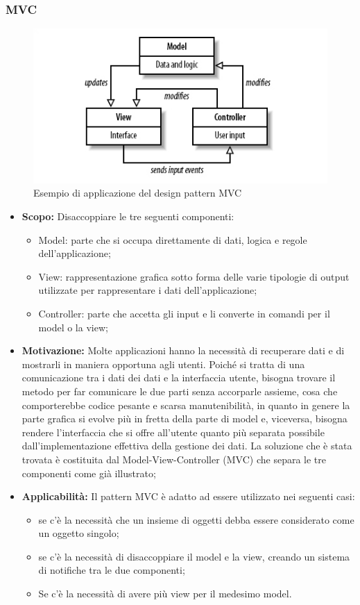 \documentclass{scalatekids-article}
\begin{document}
\subsubsection{MVC}
\begin{figure}[H]
	\begin{center}
		\includegraphics[width=0.9 \textwidth, keepaspectratio]{img/designPattern/mvc.jpg}
		\caption{Esempio di applicazione del design pattern MVC}
	\end{center}
\end{figure}
\begin{itemize}
	\item \textbf{Scopo:} Disaccoppiare le tre seguenti componenti:
	\begin{itemize}
		\item Model: parte che si occupa direttamente di dati, logica e regole dell'applicazione;
		\item View: rappresentazione grafica sotto forma delle varie tipologie di output utilizzate per rappresentare i dati dell'applicazione;
		\item Controller: parte che accetta gli input e li converte in comandi per il model o la view;
	\end{itemize}
	 \item \textbf{Motivazione:} Molte applicazioni hanno la necessità di recuperare dati e di mostrarli in maniera opportuna agli utenti. Poiché si tratta di una comunicazione tra i dati dei dati e la interfaccia utente, bisogna trovare il metodo per far comunicare le due parti senza accorparle assieme, cosa che comporterebbe codice pesante e scarsa manutenibilità, in quanto in genere la parte grafica si evolve più in fretta della parte di model e, viceversa, bisogna rendere l'interfaccia che si offre all'utente quanto più separata possibile dall'implementazione effettiva della gestione dei dati. La soluzione che è stata trovata è costituita dal  Model-View-Controller (MVC) che separa le tre componenti come già illustrato;
	 \item \textbf{Applicabilità:} Il pattern MVC è adatto ad essere utilizzato nei seguenti casi:
	 \begin{itemize}
	 	\item se c'è la necessità che un insieme di oggetti debba essere considerato come un oggetto singolo;
	 	\item se c'è la necessità di disaccoppiare il model e la view, creando un sistema di notifiche tra le due componenti;
	 	\item Se c'è la necessità di avere più view per il medesimo model.
\end{itemize}
\end{itemize}
\end{document}
